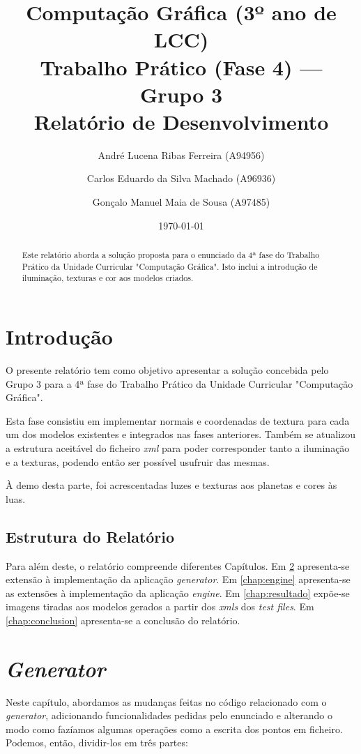 \documentclass[14pt, a4 paper]{report}
\title{Computação Gráfica (3º ano de LCC)\\
       \textbf{Trabalho Prático (Fase 4) — Grupo 3}\\ Relatório de Desenvolvimento}
\author{André Lucena Ribas Ferreira (A94956) 
    \and Carlos Eduardo da Silva Machado (A96936)
    \and Gonçalo Manuel Maia de Sousa (A97485)}
\date{\today} %
\begin{document}
\maketitle

\begin{abstract}
    Este relatório aborda a solução proposta para o enunciado da 4ª fase do Trabalho Prático da Unidade Curricular "Computação Gráfica". Isto inclui a introdução de iluminação, texturas e cor aos modelos criados. 
\end{abstract}

\tableofcontents

\chapter{Introdução} \label{chap:intro}

O presente relatório tem como objetivo apresentar a solução concebida pelo Grupo 3 para a 4ª fase do Trabalho Prático da Unidade Curricular "Computação Gráfica". 

Esta fase consistiu em implementar normais e coordenadas de textura para cada um dos modelos existentes e integrados nas fases anteriores. Também se atualizou a estrutura aceitável do ficheiro \textit{xml} para poder corresponder tanto a iluminação e a texturas, podendo então ser possível usufruir das mesmas.

À demo desta parte, foi acrescentadas luzes e texturas aos planetas e cores às luas.
\section{Estrutura do Relatório}

Para além deste, o relatório compreende diferentes Capítulos. Em \ref{chap:generator} apresenta-se extensão à implementação da aplicação \textit{generator}. Em \ref{chap:engine} apresenta-se as extensões à implementação da aplicação \textit{engine}. Em \ref{chap:resultado} expõe-se imagens tiradas aos modelos gerados a partir dos \textit{xmls} dos \textit{test files}.
Em \ref{chap:conclusion} apresenta-se a conclusão do relatório.

\chapter{\textit{Generator}} \label{chap:generator}
Neste capítulo, abordamos as mudanças feitas no código relacionado com o \textit{generator}, adicionando funcionalidades pedidas pelo enunciado e alterando o modo como fazíamos algumas operações como a escrita dos pontos em ficheiro. Podemos, então, dividir-los em três partes:
\end{document}
